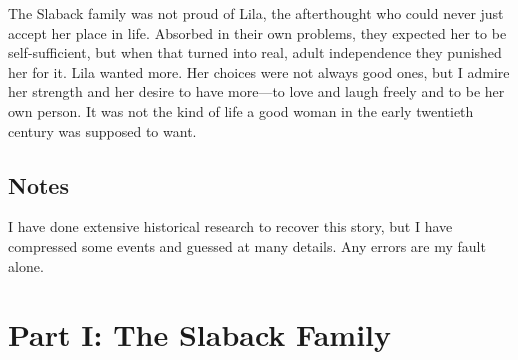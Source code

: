 \documentclass[
  letterpaper,
]{book}
\begin{document}
The Slaback family was not proud of Lila, the afterthought who could
never just accept her place in life. Absorbed in their own problems,
they expected her to be self-sufficient, but when that turned into real,
adult independence they punished her for it. Lila wanted more. Her
choices were not always good ones, but I admire her strength and her
desire to have more---to love and laugh freely and to be her own person.
It was not the kind of life a good woman in the early twentieth century
was supposed to want.

\section{Notes}\label{notes}

I have done extensive historical research to recover this story, but I
have compressed some events and guessed at many details. Any errors are
my fault alone.


\chapter{Part I: The Slaback Family}\label{part-i-the-slaback-family}
\end{document}
